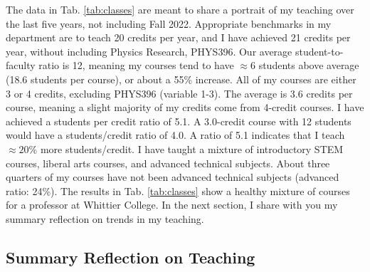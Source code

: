 \documentclass[../../../main.tex]{subfiles}
\begin{document}
The data in Tab. \ref{tab:classes} are meant to share a portrait of my teaching over the last five years, not including Fall 2022.  Appropriate benchmarks in my department are to teach 20 credits per year, and I have achieved 21 credits per year, without including Physics Research, PHYS396.  Our average student-to-faculty ratio is 12, meaning my courses tend to have $\approx 6$ students above average (18.6 students per course), or about a 55\% increase.  All of my courses are either 3 or 4 credits, excluding PHYS396 (variable 1-3).  The average is 3.6 credits per course, meaning a slight majority of my credits come from 4-credit courses.  I have achieved a students per credit ratio of 5.1.  A 3.0-credit course with 12 students would have a students/credit ratio of 4.0.  A ratio of 5.1 indicates that I teach $\approx 20$\% more students/credit.  I have taught a mixture of introductory STEM courses, liberal arts courses, and advanced technical subjects.  About three quarters of my courses have not been advanced technical subjects (advanced ratio: 24\%).  The results in Tab. \ref{tab:classes} show a healthy mixture of courses for a professor at Whittier College.  In the next section, I share with you my summary reflection on trends in my teaching.

\subsection{Summary Reflection on Teaching}
\end{document}
